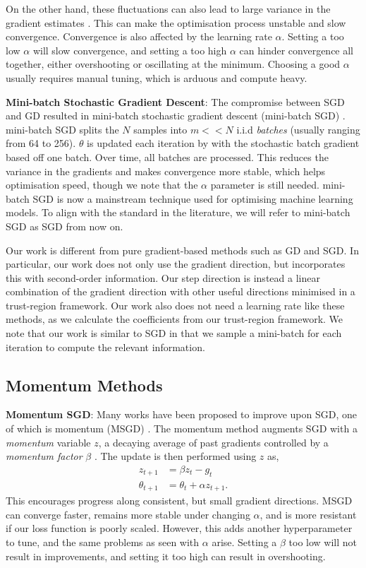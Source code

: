 On the other hand, these fluctuations can also lead to large variance in the gradient estimates \citep{sun2019survey}. This can make the optimisation process unstable and slow convergence. Convergence is also affected by the learning rate $\alpha$. Setting a too low $\alpha$ will slow convergence, and setting a too high $\alpha$ can hinder convergence all together, either overshooting or oscillating at the minimum. Choosing a good $\alpha$ usually requires manual tuning, which is arduous and compute heavy.

\textbf{Mini-batch Stochastic Gradient Descent}: The compromise between SGD and GD resulted in mini-batch stochastic gradient descent (mini-batch SGD) \citep{robbins1951stochastic}. mini-batch SGD splits the $N$ samples into $m << N$ i.i.d \textit{batches} (usually ranging from 64 to 256). $\theta$ is updated each iteration by with the stochastic batch gradient based off one batch. Over time, all batches are processed. This reduces the variance in the gradients and makes convergence more stable, which helps optimisation speed, though we note that the $\alpha$ parameter is still needed. mini-batch SGD is now a mainstream technique used for optimising machine learning models. To align with the standard in the literature, we will refer to mini-batch SGD as SGD from now on.

Our work is different from pure gradient-based methods such as GD and SGD. In particular, our work does not only use the gradient direction, but incorporates this with second-order information. Our step direction is instead a linear combination of the gradient direction with other useful directions minimised in a trust-region framework. Our work also does not need a learning rate like these methods, as we calculate the coefficients from our trust-region framework. We note that our work is similar to SGD in that we sample a mini-batch for each iteration to compute the relevant information.

\subsection{Momentum Methods} 
\label{ssec:momentum}

\textbf{Momentum SGD}: Many works have been proposed to improve upon SGD, one of which is momentum (MSGD) \citep{polyak1964some}. The momentum method augments SGD with a \textit{momentum} variable $z$, a decaying average of past gradients controlled by a \textit{momentum factor} $\beta$ \citep{polyak1964some, henriques2019small}. The update is then performed using $z$ as,
\begin{align}
    z_{t+1} &= \beta z_{t} - g_t \\
    \theta_{t+1} &= \theta_t + \alpha z_{t+1}.
\end{align}
This encourages progress along consistent, but small gradient directions. 
MSGD can converge faster, remains more stable under changing $\alpha$, and is more resistant if our loss function is poorly scaled. However, this adds another hyperparameter to tune, and the same problems as seen with $\alpha$ arise. Setting a $\beta$ too low will not result in improvements, and setting it too high can result in overshooting.

